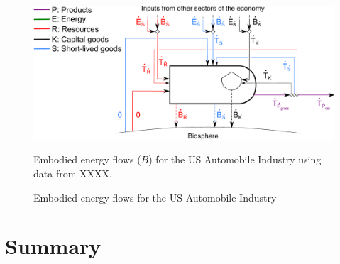 \begin{figure}[!ht]
\centering
\includegraphics[width=0.8\linewidth]{Part_1/Chapter_Embodied/images/PERKS_basic_unit_embodied_energy_content_auto_ind.pdf}
\caption{Embodied energy flows for the US Automobile Industry}{Embodied energy flows ($\dot{B}$) for the US Automobile Industry using data from XXXX.}
\label{fig:PERKS_embodied_auto}
\end{figure}

\section{Summary}
\label{sec:embodied_energy_summary}








%
%

